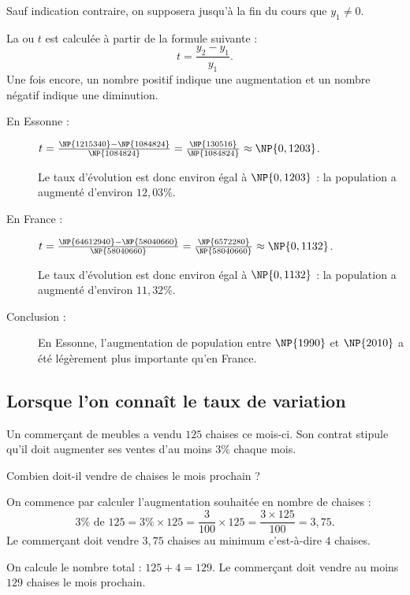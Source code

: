 \documentclass[10pt,openright,twoside,french]{book}
\begin{document}
\begin{Rmq}
    Sauf indication contraire, on supposera jusqu'à la fin du cours que $y_1 \neq 0$.
\end{Rmq}\medskip

\begin{Defi}
    La  ou  $t$ est calculée à partir de la formule suivante : \[t = \frac{y_2 - y_1}{y_1}.\]
    Une fois encore, un nombre positif indique une augmentation et un nombre négatif indique une diminution.
\end{Defi}

\begin{Exemple}[s]
    \begin{description}
        \item[En Essonne :] $t = \frac{\NP{1215340} - \NP{1084824}}{\NP{1084824}} = \frac{\NP{130516}}{\NP{1084824}}\approx \NP{0,1203}$.\par\medskip
        Le taux d'évolution est donc environ égal à $\NP{0,1203}$ : la population a augmenté d'environ $12,03\%$.
        \item[En France :] $t = \frac{\NP{64 612 940} - \NP{58 040 660}}{\NP{58 040 660}} = \frac{\NP{6572280}}{\NP{58 040 660}}\approx \NP{0,1132}$.\par\medskip
        Le taux d'évolution est donc environ égal à $\NP{0,1132}$ : la population a augmenté d'environ $11,32\%$.\medskip
        \item[Conclusion :] En Essonne, l'augmentation de population entre $\NP{1990}$ et $\NP{2010}$ a été légèrement plus importante qu'en France.
    \end{description}
\end{Exemple}

\subsection{Lorsque l'on connaît le taux de variation}
\begin{Exemple}
    Un commerçant de meubles a vendu $125$ chaises ce mois-ci. Son contrat stipule qu'il doit augmenter ses ventes d'au moins $3\%$ chaque mois.\par
    Combien doit-il vendre de chaises le mois prochain ?\medskip

    On commence par calculer l'augmentation souhaitée en nombre de chaises :
    \[3\% \text{ de } 125 = 3\% \times 125 = \frac{3}{100} \times 125 = \frac{3 \times 125}{100} = 3,75.\]
    Le commerçant doit vendre $3,75$ chaises au minimum c'est-à-dire $4$ chaises.\par\smallskip
    On calcule le nombre total : $125 + 4 = 129$. Le commerçant doit vendre au moins $129$ chaises le mois prochain.
\end{Exemple}
\end{document}
